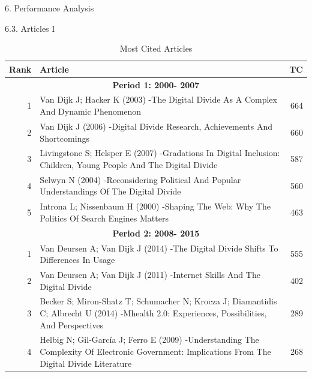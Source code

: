 \documentclass[
  ignorenonframetext,
]{beamer}
\begin{document}
\begin{frame}{6. Performance Analysis}
\protect\hypertarget{performance-analysis-2}{}
\begin{block}{6.3. Articles I}
\protect\hypertarget{articles-i}{}
\begin{table}

\caption{\label{tab:Influence of AU table }Most Cited Articles}
\centering
\fontsize{5}{7}\selectfont
\begin{tabular}[t]{r|p{9cm}|r}
\hline
\textbf{Rank} & \textbf{Article} & \textbf{TC}\\
\hline
\multicolumn{3}{c}{\textbf{Period 1: 2000- 2007}}\\
\hline
\hspace{1em}1 & Van Dijk J; Hacker K (2003) -The Digital Divide As A Complex And Dynamic Phenomenon & 664\\
\hline
\hspace{1em}2 & Van Dijk J (2006) -Digital Divide Research, Achievements And Shortcomings & 660\\
\hline
\hspace{1em}3 & Livingstone S; Helsper E (2007) -Gradations In Digital Inclusion: Children, Young People And The Digital Divide & 587\\
\hline
\hspace{1em}4 & Selwyn N (2004) -Reconsidering Political And Popular Understandings Of The Digital Divide & 560\\
\hline
\hspace{1em}5 & Introna L; Nissenbaum H (2000) -Shaping The Web: Why The Politics Of Search Engines Matters & 463\\
\hline
\multicolumn{3}{c}{\textbf{Period 2: 2008- 2015}}\\
\hline
\hspace{1em}1 & Van Deursen A; Van Dijk J (2014) -The Digital Divide Shifts To Differences In Usage & 555\\
\hline
\hspace{1em}2 & Van Deursen A; Van Dijk J (2011) -Internet Skills And The Digital Divide & 402\\
\hline
\hspace{1em}3 & Becker S; Miron-Shatz T; Schumacher N; Krocza J; Diamantidis C; Albrecht U (2014) -Mhealth 2.0: Experiences, Possibilities, And Perspectives & 289\\
\hline
\hspace{1em}4 & Helbig N; Gil-García J; Ferro E (2009) -Understanding The Complexity Of Electronic Government: Implications From The Digital Divide Literature & 268\\

\end{tabular}
\end{table}
\end{block}
\end{frame}
\end{document}
